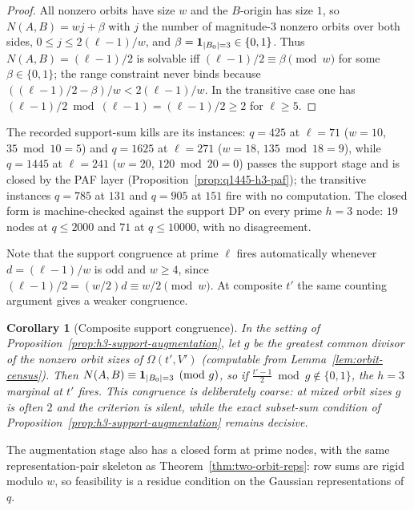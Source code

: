 \documentclass[11pt]{article}
\theoremstyle{plain}
\newtheorem{corollary}[theorem]{Corollary}
\theoremstyle{definition}
\theoremstyle{remark}
\begin{document}
\begin{proof}
All nonzero orbits have size $w$ and the $B$-origin has size $1$, so
$N(A,B)=wj+\beta$ with $j$ the number of magnitude-$3$ nonzero orbits over
both sides, $0\le j\le2(\ell-1)/w$, and $\beta={\bf1}_{|B_0|=3}\in\{0,1\}$.
Thus $N(A,B)=(\ell-1)/2$ is solvable iff $(\ell-1)/2\equiv\beta\pmod w$ for
some $\beta\in\{0,1\}$; the range constraint never binds because
$((\ell-1)/2-\beta)/w<2(\ell-1)/w$.  In the transitive case one has
$(\ell-1)/2\bmod(\ell-1)=(\ell-1)/2\ge2$ for $\ell\ge5$.
\end{proof}

The recorded support-sum kills are its instances: $q=425$ at $\ell=71$
($w=10$, $35\bmod10=5$) and $q=1625$ at $\ell=271$ ($w=18$,
$135\bmod18=9$), while $q=1445$ at $\ell=241$ ($w=20$, $120\bmod20=0$)
passes the support stage and is closed by the PAF layer
(Proposition~\ref{prop:q1445-h3-paf}); the transitive instances
$q=785$ at $131$ and $q=905$ at $151$ fire with no computation.  The
closed form is machine-checked against the support DP on every prime
$h=3$ node: $19$ nodes at $q\le2000$ and $71$ at $q\le10000$, with no
disagreement.

Note that the support congruence at prime $\ell$ fires automatically
whenever $d=(\ell-1)/w$ is odd and $w\ge4$, since
$(\ell-1)/2=(w/2)d\equiv w/2\pmod w$.  At composite $t'$ the same
counting argument gives a weaker congruence.

\begin{corollary}[Composite support congruence]\label{cor:h3-support-sum-gcd}
In the setting of Proposition~\ref{prop:h3-support-augmentation}, let $g$
be the greatest common divisor of the nonzero orbit sizes of
$\Omega(t',V')$ (computable from Lemma~\ref{lem:orbit-census}).  Then
$N(A,B)\equiv{\bf1}_{|B_0|=3}\pmod g$, so if
$\frac{t'-1}2\bmod g\notin\{0,1\}$, the $h=3$ marginal at $t'$ fires.
This congruence is deliberately coarse: at mixed orbit sizes $g$ is often
$2$ and the criterion is silent, while the exact subset-sum condition of
Proposition~\ref{prop:h3-support-augmentation} remains decisive.
\end{corollary}

The augmentation stage also has a closed form at prime nodes, with the
same representation-pair skeleton as Theorem~\ref{thm:two-orbit-reps}:
row sums are rigid modulo $w$, so feasibility is a residue condition on
the Gaussian representations of $q$.
\end{document}
